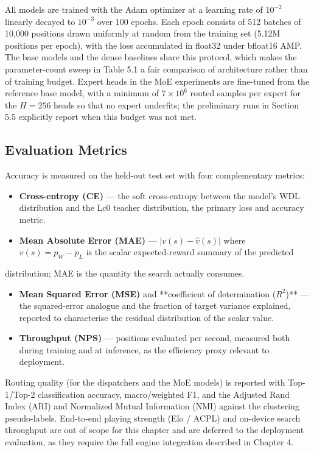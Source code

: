 All models are trained with the Adam optimizer at a learning rate of $10^{-2}$ linearly decayed to $10^{-3}$ over 100 epochs. Each epoch consists of 512 batches of 10,000 positions drawn uniformly at random from the training set (5.12M positions per epoch), with the loss accumulated in float32 under bfloat16 AMP. The base models and the dense baselines share this protocol, which makes the parameter-count sweep in Table 5.1 a fair comparison of architecture rather than of training budget. Expert heads in the MoE experiments are fine-tuned from the reference base model, with a minimum of $7\times10^6$ routed samples per expert for the $H{=}256$ heads so that no expert underfits; the preliminary runs in Section 5.5 explicitly report when this budget was not met.

\subsection{Evaluation Metrics}

Accuracy is measured on the held-out test set with four complementary metrics:

\begin{itemize}
  \item \textbf{Cross-entropy (CE)} --- the soft cross-entropy between the model's WDL distribution and the Lc0 teacher distribution, the primary loss and accuracy metric.
  \item \textbf{Mean Absolute Error (MAE)} --- $|v(s) - \hat{v}(s)|$ where $v(s) = p_W - p_L$ is the scalar expected-reward summary of the predicted
\end{itemize}

distribution; MAE is the quantity the search actually consumes.
\begin{itemize}
  \item \textbf{Mean Squared Error (MSE)} and **coefficient of determination ($R^2$)** --- the squared-error analogue and the fraction of target variance explained, reported to characterise the residual distribution of the scalar value.
  \item \textbf{Throughput (NPS)} --- positions evaluated per second, measured both during training and at inference, as the efficiency proxy relevant to deployment.
\end{itemize}



Routing quality (for the dispatchers and the MoE models) is reported with Top-1/Top-2 classification accuracy, macro/weighted F1, and the Adjusted Rand Index (ARI) and Normalized Mutual Information (NMI) against the clustering pseudo-labels. End-to-end playing strength (Elo / ACPL) and on-device search throughput are out of scope for this chapter and are deferred to the deployment evaluation, as they require the full engine integration described in Chapter 4.

